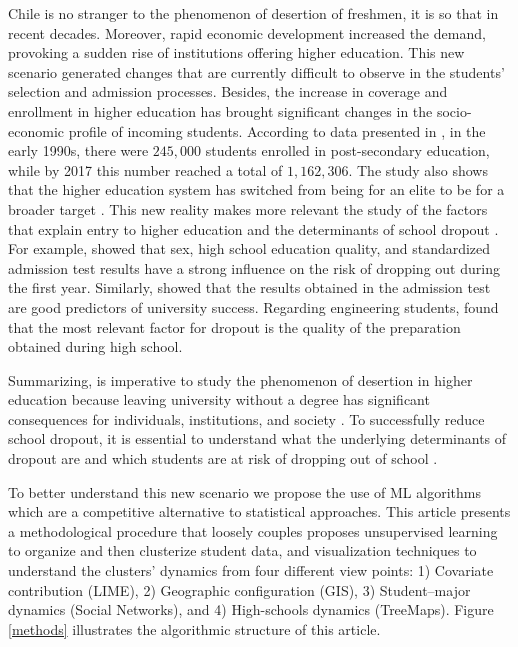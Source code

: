 \documentclass[5p,authoryear,preprint,12pt]{elsarticle}
\begin{document}
Chile is no stranger to the phenomenon of desertion of freshmen, it is so that in recent decades. Moreover, rapid economic development increased the demand, provoking a sudden rise of institutions offering higher education. This new scenario generated changes that are currently difficult to observe in the students' selection and admission processes. Besides, the increase in coverage and enrollment in higher education has brought significant changes in the socio-economic profile of incoming students. According to data presented in \citet{gallegos2018factores}, in the early 1990s, there were $245,000$ students enrolled in post-secondary education, while by 2017 this number reached a total of $1,162,306$. The study also shows that the higher education system has switched from being for an elite to be for a broader target \citep{gallegos2018factores}. This new reality makes more relevant the study of the factors that explain entry to higher education and the determinants of school dropout \citep{acuna2010access}. For example, \citet{rolando2012retention} showed that sex, high school education quality, and standardized admission test results have a strong influence on the risk of dropping out during the first year. Similarly, \citep{manzi2008estudio} showed that the results obtained in the admission test are good predictors of university success. Regarding engineering students, \citep{diaz2009factores} found that the most relevant factor for dropout is the quality of the preparation obtained during high school.

Summarizing, is imperative to study the phenomenon of desertion in higher education because leaving university without a degree has significant consequences for individuals, institutions, and society \citep{bernardo2017freshmen, sarra2018identifying}. To successfully reduce school dropout, it is essential to understand what the underlying determinants of dropout are and which students are at risk of dropping out of school \citep{berens2018early}. 

To better understand this new scenario we propose the use of ML algorithms which are a competitive alternative to statistical approaches. This article presents a methodological procedure that loosely couples proposes unsupervised learning to organize and then clusterize student data, and visualization techniques to understand the clusters' dynamics from four different view points: 1) Covariate contribution (LIME), 2) Geographic configuration (GIS), 3) Student--major dynamics (Social Networks), and 4) High-schools dynamics (TreeMaps). Figure \ref{methods} illustrates the algorithmic structure of this article.
\end{document}
